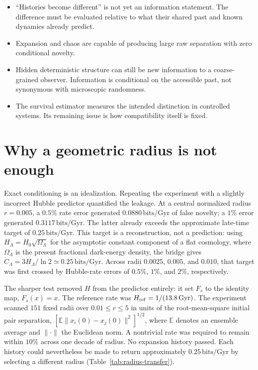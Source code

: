 \documentclass[10pt]{article}
\newenvironment{persuasions}
  {\begin{cpbox}\small\setlength{\parskip}{0pt}%
   {\footnotesize\bfseries\color{accent}%
    \textls[110]{CONCEPTUAL PERSUASIONS}}\par\vspace{3pt}%
   \begin{itemize}[leftmargin=1.15em,itemsep=2.5pt,topsep=0pt,parsep=0pt,
                   label=\textcolor{accent}{\scriptsize$\blacktriangleright$}]}
  {\end{itemize}\end{cpbox}}
\begin{document}
\begin{persuasions}
\item ``Histories become different'' is not yet an information statement.
The difference must be evaluated relative to what their shared past and known
dynamics already predict.
\item Expansion and chaos are capable of producing large raw separation with
zero conditional novelty.
\item Hidden deterministic structure can still be new information to a
coarse-grained observer.  Information is conditional on the accessible past,
not synonymous with microscopic randomness.
\item The survival estimator measures the intended distinction in controlled
systems.  Its remaining issue is how compatibility itself is fixed.
\end{persuasions}

\section*{Why a geometric radius is not enough}

Exact conditioning is an idealization.  Repeating the experiment with a
slightly incorrect Hubble predictor quantified the leakage.  At a central
normalized radius $r=0.005$, a $0.5\%$ rate error generated
$0.0880\,\mathrm{bits/Gyr}$ of false novelty; a $1\%$ error generated
$0.3117\,\mathrm{bits/Gyr}$.  The latter already exceeds the approximate
late-time target of $0.25\,\mathrm{bits/Gyr}$.  This target is a reconstruction,
not a prediction: using $H_\Lambda=H_0\sqrt{\Omega_\Lambda}$ for the asymptotic
constant component of a flat cosmology, where $\Omega_\Lambda$ is the present
fractional dark-energy density, the bridge gives
$\dot C_\Lambda=3H_\Lambda/\ln2\simeq0.25\,\mathrm{bits/Gyr}$.  Across radii
$0.0025$, $0.005$, and $0.010$, that target was first
crossed by Hubble-rate errors of $0.5\%$, $1\%$, and $2\%$, respectively.

The sharper test removed $H$ from the predictor entirely: it set $F_s$ to the
identity map, $F_s(x)=x$.  The reference rate was
$H_{\rm ref}=1/(13.8\,\mathrm{Gyr})$.  The experiment scanned $151$ fixed
radii over $0.01\le r\le5$ in units of the root-mean-square initial pair
separation, $[\mathbb E\|x_i(0)-x_j(0)\|^2]^{1/2}$, where $\mathbb E$ denotes
an ensemble average and $\|\cdot\|$ the Euclidean norm.  A nontrivial rate was
required to remain within
$10\%$ across one decade of radius.  No expansion history passed.  Each
history could nevertheless be made to return approximately
$0.25\,\mathrm{bits/Gyr}$ by selecting a different radius
(Table~\ref{tab:radius-transfer}).
\end{document}
